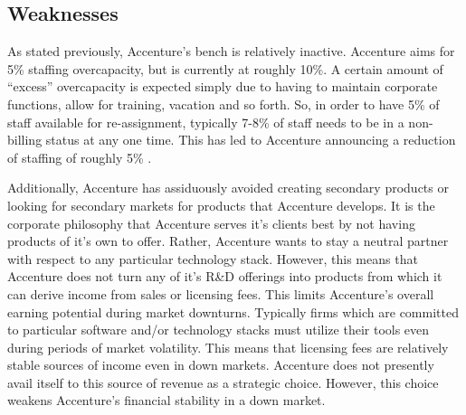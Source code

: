 \subsection{Weaknesses}

As stated previously, Accenture's bench is relatively inactive. Accenture aims for 5\% staffing overcapacity, but is currently at roughly 10\%. A certain amount of ``excess'' overcapacity is expected simply due to having to maintain corporate functions, allow for training, vacation and so forth. So, in order to have 5\% of staff available for re-assignment, typically 7-8\% of staff needs to be in a non-billing status at any one time. This has led to Accenture announcing a reduction of staffing of roughly 5\% \parencite{owusuAccentureCut25}.

Additionally, Accenture has assiduously avoided creating secondary products or looking for secondary markets for products that Accenture develops. It is the corporate philosophy that Accenture serves it's clients best by not having products of it's own to offer. Rather, Accenture wants to stay a neutral partner with respect to any particular technology stack. However, this means that Accenture does not turn any of it's R\&D offerings into products from which it can derive income from sales or licensing fees. This limits Accenture's overall earning potential during market downturns. Typically firms which are committed to particular software and/or technology stacks must utilize their tools even during periods of market volatility. This means that licensing fees are relatively stable sources of income even in down markets. Accenture does not presently avail itself to this source of revenue as a strategic choice. However, this choice weakens Accenture's financial stability in a down market.
